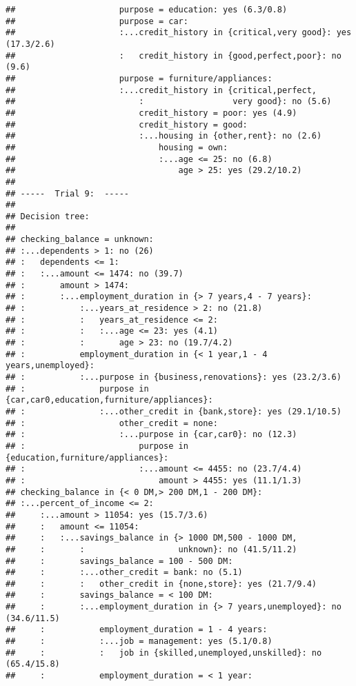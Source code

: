 \documentclass[
]{article}
\begin{document}
\begin{verbatim}
##                     purpose = education: yes (6.3/0.8)
##                     purpose = car:
##                     :...credit_history in {critical,very good}: yes (17.3/2.6)
##                     :   credit_history in {good,perfect,poor}: no (9.6)
##                     purpose = furniture/appliances:
##                     :...credit_history in {critical,perfect,
##                         :                  very good}: no (5.6)
##                         credit_history = poor: yes (4.9)
##                         credit_history = good:
##                         :...housing in {other,rent}: no (2.6)
##                             housing = own:
##                             :...age <= 25: no (6.8)
##                                 age > 25: yes (29.2/10.2)
## 
## -----  Trial 9:  -----
## 
## Decision tree:
## 
## checking_balance = unknown:
## :...dependents > 1: no (26)
## :   dependents <= 1:
## :   :...amount <= 1474: no (39.7)
## :       amount > 1474:
## :       :...employment_duration in {> 7 years,4 - 7 years}:
## :           :...years_at_residence > 2: no (21.8)
## :           :   years_at_residence <= 2:
## :           :   :...age <= 23: yes (4.1)
## :           :       age > 23: no (19.7/4.2)
## :           employment_duration in {< 1 year,1 - 4 years,unemployed}:
## :           :...purpose in {business,renovations}: yes (23.2/3.6)
## :               purpose in {car,car0,education,furniture/appliances}:
## :               :...other_credit in {bank,store}: yes (29.1/10.5)
## :                   other_credit = none:
## :                   :...purpose in {car,car0}: no (12.3)
## :                       purpose in {education,furniture/appliances}:
## :                       :...amount <= 4455: no (23.7/4.4)
## :                           amount > 4455: yes (11.1/1.3)
## checking_balance in {< 0 DM,> 200 DM,1 - 200 DM}:
## :...percent_of_income <= 2:
##     :...amount > 11054: yes (15.7/3.6)
##     :   amount <= 11054:
##     :   :...savings_balance in {> 1000 DM,500 - 1000 DM,
##     :       :                   unknown}: no (41.5/11.2)
##     :       savings_balance = 100 - 500 DM:
##     :       :...other_credit = bank: no (5.1)
##     :       :   other_credit in {none,store}: yes (21.7/9.4)
##     :       savings_balance = < 100 DM:
##     :       :...employment_duration in {> 7 years,unemployed}: no (34.6/11.5)
##     :           employment_duration = 1 - 4 years:
##     :           :...job = management: yes (5.1/0.8)
##     :           :   job in {skilled,unemployed,unskilled}: no (65.4/15.8)
##     :           employment_duration = < 1 year:

\end{verbatim}
\end{document}
